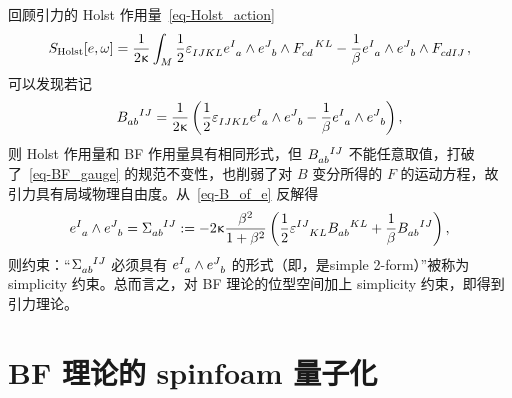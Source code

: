 			回顾引力的 Holst 作用量~\eqref{eq-Holst_action}
			\begin{equation}
				S_{\text{Holst}}[e,\omega] = \frac{1}{2\gkappa} \int_M \frac{1}{2} \tensor{\vol}{_I_J_K_L} \tensor{e}{^I_a} \wedge \tensor{e}{^J_b} \wedge \tensor{F}{_c_d^K^L} - \frac{1}{\beta} \tensor{e}{^I_a} \wedge \tensor{e}{^J_b} \wedge \tensor{F}{_c_d_I_J},
			\end{equation}
			可以发现若记
			\begin{equation}
				\tensor{B}{_a_b^I^J} = \frac{1}{2\gkappa} \left( \frac{1}{2} \tensor{\vol}{_I_J_K_L} \tensor{e}{^I_a} \wedge \tensor{e}{^J_b} - \frac{1}{\beta} \tensor{e}{^I_a} \wedge \tensor{e}{^J_b} \right),\label{eq-B_of_e}
			\end{equation}
			则 Holst 作用量和 BF 作用量具有相同形式，但 $\tensor{B}{_a_b^I^J}$ 不能任意取值，打破了~\eqref{eq-BF_gauge} 的规范不变性，也削弱了对 $B$ 变分所得的 $F$ 的运动方程，故引力具有局域物理自由度。从~\eqref{eq-B_of_e} 反解得
			\begin{equation}
				\tensor{e}{^I_a} \wedge \tensor{e}{^J_b} = \tensor{\Sigma}{_a_b^I^J} \definedby -2\gkappa \frac{\beta^2}{1+\beta^2} \left( \frac{1}{2} \tensor{\vol}{^I^J_K_L} \tensor{B}{_a_b^K^L} + \frac{1}{\beta} \tensor{B}{_a_b^I^J} \right),\label{eq-e_of_B}
			\end{equation}
			则约束：“$\tensor{\Sigma}{_a_b^I^J}$ 必须具有 $\tensor{e}{^I_a} \wedge \tensor{e}{^J_b}$ 的形式（即，是simple 2-form）”被称为 simplicity 约束。总而言之，对 BF 理论的位型空间加上 simplicity 约束，即得到引力理论。

	\section{BF 理论的 spinfoam 量子化}

